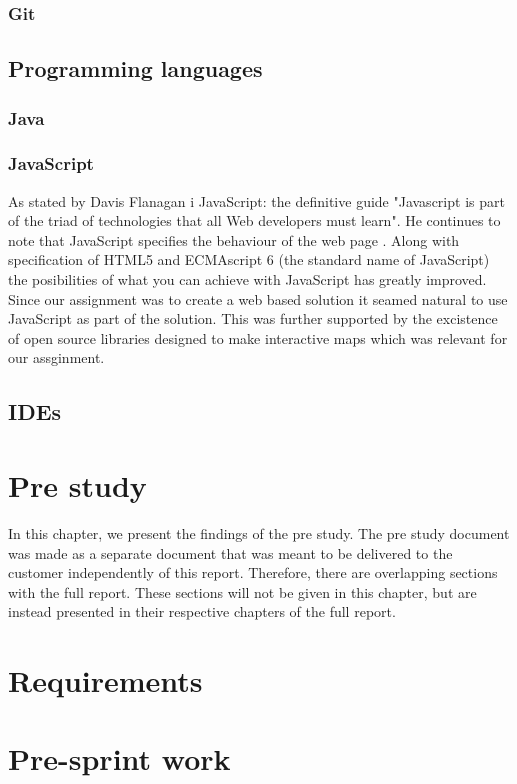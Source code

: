 \documentclass[11pt,a4paper,titlepage,oneside]{report}
\begin{document}
  \subsection{Git}

\section{Programming languages}
  \subsection{Java}
  \subsection{JavaScript}
  As stated by Davis Flanagan i JavaScript: the definitive guide "Javascript is part of the triad of technologies that all Web developers must learn". He continues to note that JavaScript specifies the behaviour of the web page \cite{fd11}. Along with specification of HTML5 and ECMAscript 6 (the standard name of JavaScript) the posibilities of what you can achieve with JavaScript has greatly improved. Since our assignment was to create a web based solution it seamed natural to use JavaScript as part of the solution. This was further supported by the excistence of open source libraries designed to make interactive maps which was relevant for our assginment.

\section{IDEs}

\chapter{Pre study}
In this chapter, we present the findings of the pre study. The pre study document was made as a separate document that was meant to be delivered to the customer independently of this report. Therefore, there are overlapping sections with the full report. These sections will not be given in this chapter, but are instead presented in their respective chapters of the full report. 

\chapter{Requirements}

\chapter {Pre-sprint work}
\end{document}
